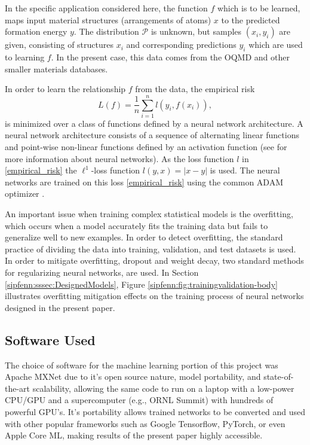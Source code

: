 In the specific application considered here, the function $f$ which is to be learned, maps input material structures (arrangements of atoms) $x$ to the predicted formation energy $y$. The distribution $\mathcal{P}$ is unknown, but samples $(x_i,y_i)$ are given, consisting of structures $x_i$ and corresponding predictions $y_i$ which are used to learning $f$. In the present case, this data comes from the OQMD and other smaller materials databases.


In order to learn the relationship $f$ from the data, the empirical risk
\begin{equation}\label{sipfenn:empirical_risk}
    L(f) = \frac{1}{n}\displaystyle\sum_{i=1}^n l(y_i, f(x_i)),
\end{equation}
is minimized over a class of functions defined by a neural network architecture. A neural network architecture consists of a sequence of alternating linear functions and point-wise non-linear functions defined by an activation function (see \cite{goodfellow2016deep} for more information about neural networks). As the loss function $l$ in \eqref{empirical_risk} the $\ell^1$-loss function $l(y,x) = |x-y|$ is used. The neural networks are trained on this loss \eqref{empirical_risk} using the common ADAM optimizer \cite{kingma2014adam}. 

An important issue when training complex statistical models is the overfitting, which occurs when a model accurately fits the training data but fails to generalize well to new examples. In order to detect overfitting, the standard practice of dividing the data into training, validation, and test datasets \cite{hastie2009elements} is used. In order to mitigate overfitting, dropout \cite{srivastava2014dropout} and weight decay, two standard methods for regularizing neural networks, are used. In Section \ref{sipfenn:sssec:DesignedModels}, Figure \ref{sipfenn:fig:trainingvalidation-body} illustrates overfitting mitigation effects on the training process of neural networks designed in the present paper.

\subsection{Software Used} \label{sipfenn:sssec:SoftwareUsed}
The choice of software for the machine learning portion of this project was Apache MXNet \cite{ChenMXNet:Systems} due to it's open source nature, model portability, and state-of-the-art scalability, allowing the same code to run on a laptop with a low-power CPU/GPU and a supercomputer (e.g., ORNL Summit) with hundreds of powerful GPU's. It's portability allows trained networks to be converted and used with other popular frameworks such as Google Tensorflow, PyTorch, or even Apple Core ML, making results of the present paper highly accessible.

